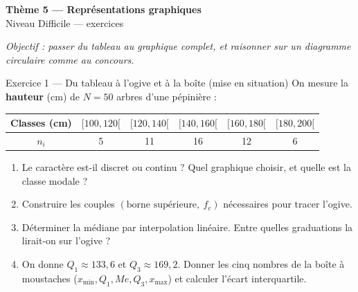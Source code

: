 \documentclass[11pt,a4paper]{article}
\newcommand{\bandeau}[2]{%
\begin{tcolorbox}[boxbase,colback=primary,colframe=primarydark,halign=center,
   before skip=2pt,after skip=12pt]
{\LARGE\bfseries\color{white} #1}\\[3pt]{\normalsize\color{white} #2}
\end{tcolorbox}}
\newcommand{\med}{M\!e}
\begin{document}
\bandeau{Thème 5 — Représentations graphiques}{Niveau Difficile — exercices}

\noindent\textit{Objectif : passer du tableau au graphique complet, et raisonner sur un diagramme
circulaire comme au concours.}\medskip

\begin{exobox}{Exercice 1 — Du tableau à l'ogive et à la boîte (mise en situation)}
On mesure la \textbf{hauteur} (cm) de $N=50$ arbres d'une pépinière :
\begin{center}
\renewcommand{\arraystretch}{1.2}
\begin{tabular}{|c|c|c|c|c|c|}
\hline
Classes (cm) & $[100,120[$ & $[120,140[$ & $[140,160[$ & $[160,180[$ & $[180,200[$ \\\hline
$n_i$ & 5 & 11 & 16 & 12 & 6 \\\hline
\end{tabular}
\end{center}
\begin{enumerate}[label=\textbf{(\alph*)}]
  \item Le caractère est-il discret ou continu ? Quel graphique choisir, et quelle est la classe modale ?
  \item Construire les couples $(\text{borne supérieure},\ f_c)$ nécessaires pour tracer l'ogive.
  \item Déterminer la médiane par interpolation linéaire. Entre quelles graduations la lirait-on
        sur l'ogive ?
  \item On donne $Q_1\approx133{,}6$ et $Q_3\approx169{,}2$. Donner les cinq nombres de la boîte à
        moustaches ($x_{\min},Q_1,\med,Q_3,x_{\max}$) et calculer l'écart interquartile.
\end{enumerate}
\end{exobox}
\end{document}
